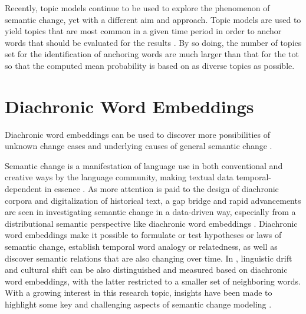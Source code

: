 Recently, topic models continue to be used to explore the phenomenon of semantic change, yet with a different aim and approach. Topic models are used to yield topics that are most common in a given time period in order to anchor words that should be evaluated for the results \parencite{antoniak2018evaluating}. By so doing, the number of topics set for the identification of anchoring words are much larger than that for the \gls{tot} so that the computed mean probability is based on as diverse topics as possible.

\section{Diachronic Word Embeddings}
Diachronic word embeddings can be used to discover more possibilities of unknown change cases and underlying causes of general semantic change \parencite{hamilton2016cultural,kutuzov2017tracing,heuser2017word}.

Semantic change is a manifestation of language use in both conventional and creative ways by the language community, making textual data temporal-dependent in essence \parencite{kutuzov2018survey}. As more attention is paid to the design of diachronic corpora and digitalization of historical text, a gap bridge and rapid advancements are seen in investigating semantic change in a data-driven way, especially from a distributional semantic perspective like diachronic word embeddings \parencite{kutuzov2018survey, tahmasebi2018survey, hamilton2016law, jawahar2019contextualized}. Diachronic word embeddings make it possible to formulate or test hypotheses or laws of semantic change, establish temporal word analogy or relatedness, as well as discover semantic relations that are also changing over time. In \textcite{hamilton2016cultural}, linguistic drift and cultural shift can be also distinguished and measured based on diachronic word embeddings, with the latter restricted to a smaller set of neighboring words. With a growing interest in this research topic, insights have been made to highlight some key and challenging aspects of semantic change modeling \parencite{kutuzov2018survey,tahmasebi2018survey,camacho2018survey}.

